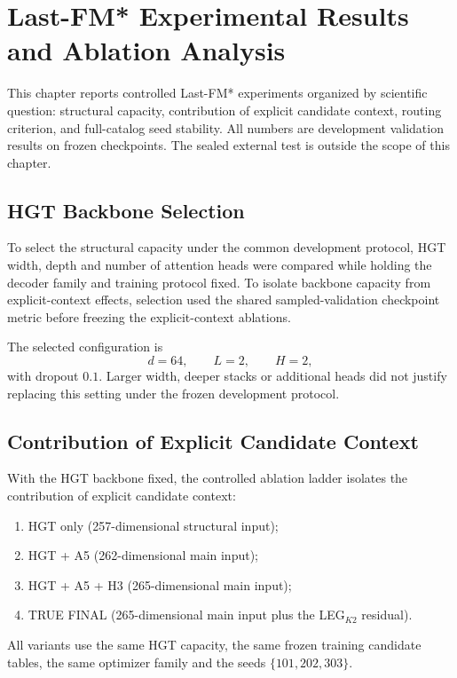 \chapter{Last-FM* Experimental Results and Ablation Analysis}
\label{ch:lastfm-benchmark}

This chapter reports controlled Last-FM* experiments organized by scientific question:
structural capacity, contribution of explicit candidate context, routing criterion, and full-catalog seed stability.
All numbers are development validation results on frozen checkpoints.
The sealed external test is outside the scope of this chapter.

\section{HGT Backbone Selection}
\label{sec:lastfm-backbone}

To select the structural capacity under the common development protocol, HGT width, depth and number of attention heads were compared while holding the decoder family and training protocol fixed.
To isolate backbone capacity from explicit-context effects, selection used the shared sampled-validation checkpoint metric before freezing the explicit-context ablations.

The selected configuration is
\begin{equation}
d=64,\qquad L=2,\qquad H=2,
\end{equation}
with dropout $0.1$.
Larger width, deeper stacks or additional heads did not justify replacing this setting under the frozen development protocol.

\section{Contribution of Explicit Candidate Context}
\label{sec:lastfm-ablation}

With the HGT backbone fixed, the controlled ablation ladder isolates the contribution of explicit candidate context:
\begin{enumerate}
\item HGT only (257-dimensional structural input);
\item HGT + A5 (262-dimensional main input);
\item HGT + A5 + H3 (265-dimensional main input);
\item TRUE FINAL (265-dimensional main input plus the LEG$_{K2}$ residual).
\end{enumerate}
All variants use the same HGT capacity, the same frozen training candidate tables, the same optimizer family and the seeds $\{101,202,303\}$.

